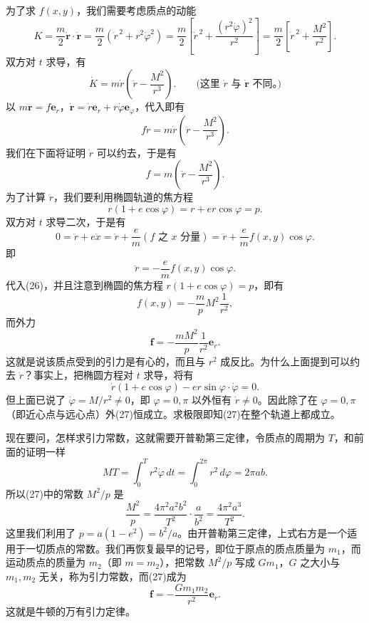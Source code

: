 为了求 $f(x,y)$，我们需要考虑质点的动能
\[
 K=\frac m2\dot{\boldsymbol r}\cdot\dot{\boldsymbol r}
 =\frac m2(\dot r^{\,2}+r^2\dot\varphi^2)
 =\frac m2\left[\dot r^{\,2}+\frac{(r^2\dot\varphi)^2}{r^2}\right]
 =\frac m2\left[\dot r^{\,2}+\frac{M^2}{r^2}\right].
\]
双方对 $t$ 求导，有
\[
 \dot K=m\dot r\left(\ddot r-\frac{M^2}{r^3}\right).\qquad\text{(这里 }\dot r\text{ 与 }\dot{\boldsymbol r}\text{ 不同。)}
\]
以 $m\ddot{\boldsymbol r}=f\boldsymbol e_r$，$\dot{\boldsymbol r}=\dot r\boldsymbol e_r+r\dot\varphi\boldsymbol e_\varphi$，代入即有
\[
 f\dot r=m\dot r\left(\ddot r-\frac{M^2}{r^3}\right).
\]
我们在下面将证明 $\dot r$ 可以约去，于是有
\begin{equation}
 f=m\left(\ddot r-\frac{M^2}{r^3}\right).
 \tag{26}
\end{equation}
为了计算 $\ddot r$，我们要利用椭圆轨道的焦方程
\[
 r(1+e\cos\varphi)=r+er\cos\varphi=p.
\]
双方对 $t$ 求导二次，于是有
\[
 0=\ddot r+e\ddot x
 =\ddot r+\frac em(f\text{ 之 }x\text{ 分量})
 =\ddot r+\frac em f(x,y)\cos\varphi.
\]
即
\[
 \ddot r=-\frac em f(x,y)\cos\varphi.
\]
代入(26)，并且注意到椭圆的焦方程 $r(1+e\cos\varphi)=p$，即有
\[
 f(x,y)=-\frac mpM^2\frac1{r^2},
\]
而外力
\begin{equation}
 \boldsymbol f=-\frac{mM^2}{p}\frac1{r^2}\boldsymbol e_r.
 \tag{27}
\end{equation}
这就是说该质点受到的引力是有心的，而且与 $r^2$ 成反比。为什么上面提到可以约去 $\dot r$？事实上，把椭圆方程对 $t$ 求导，将有
\[
 \dot r(1+e\cos\varphi)-er\sin\varphi\cdot\dot\varphi=0.
\]
但上面已说了 $\dot\varphi=M/r^2\ne0$，即 $\varphi=0,\pi$ 以外恒有 $\dot r\ne0$。因此除了在 $\varphi=0,\pi$（即近心点与远心点）外(27)恒成立。求极限即知(27)在整个轨道上都成立。

现在要问，怎样求引力常数，这就需要开普勒第三定律，令质点的周期为 $T$，和前面的证明一样
\[
 MT=\int_0^T r^2\dot\varphi\,dt=\int_0^{2\pi}r^2\,d\varphi=2\pi ab.
\]
所以(27)中的常数 $M^2/p$ 是
\[
 \frac{M^2}{p}=\frac{4\pi^2a^2b^2}{T^2}\cdot\frac{a}{b^2}
 =\frac{4\pi^2a^3}{T^2}.
\]
这里我们利用了 $p=a(1-e^2)=b^2/a$。由开普勒第三定律，上式右方是一个适用于一切质点的常数。我们再恢复最早的记号，即位于原点的质点质量为 $m_1$，而运动质点的质量为 $m_2$（即 $m=m_2$），把常数 $M^2/p$ 写成 $Gm_1$，$G$ 之大小与 $m_1,m_2$ 无关，称为引力常数，而(27)成为
\begin{equation}
 \boldsymbol f=-\frac{Gm_1m_2}{r^2}\boldsymbol e_r.
 \tag{28}
\end{equation}
这就是牛顿的万有引力定律。
